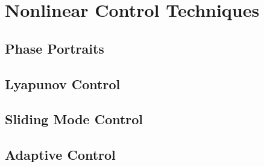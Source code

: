 \section{Nonlinear Control Techniques}\label{s:nonlinear_controls}

\subsection{Phase Portraits}

\subsection{Lyapunov Control}

\subsection{Sliding Mode Control}

\subsection{Adaptive Control}